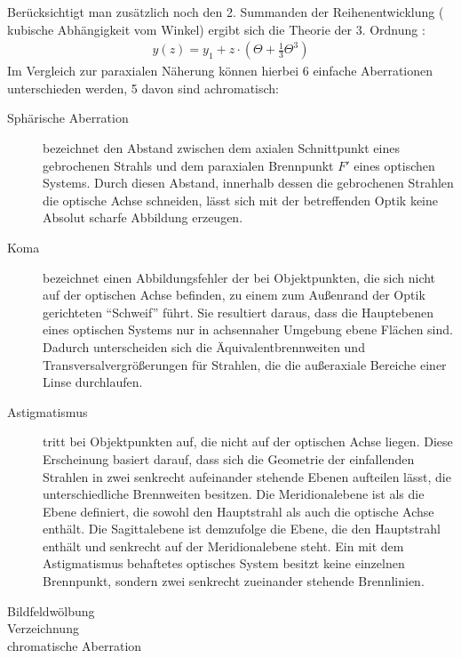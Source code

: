 Berücksichtigt man zusätzlich noch den 2. Summanden der Reihenentwicklung ( kubische Abhängigkeit vom Winkel) ergibt sich die Theorie der 3. Ordnung :
\begin{align*}
y(z)=y_1 + z \cdot (\Theta + \frac{1}{3}\Theta^3)
\end{align*}
Im Vergleich zur paraxialen Näherung können hierbei 6 einfache Aberrationen unterschieden werden, 5 davon sind achromatisch:
\begin{description}
	\item[Sphärische Aberration] bezeichnet den Abstand zwischen dem axialen Schnittpunkt eines gebrochenen Strahls und dem paraxialen Brennpunkt $F'$ eines optischen Systems. Durch diesen Abstand, innerhalb dessen die gebrochenen Strahlen die optische Achse schneiden, lässt sich mit der betreffenden Optik keine Absolut scharfe Abbildung erzeugen. \cite[416ff.]{hecht2014optik}
	\item[Koma] bezeichnet einen Abbildungsfehler der bei Objektpunkten, die sich nicht auf der optischen Achse befinden, zu einem zum Außenrand der Optik gerichteten "`Schweif"' führt. Sie resultiert daraus, dass die Hauptebenen eines optischen Systems nur in achsennaher Umgebung ebene Flächen sind. Dadurch unterscheiden sich die Äquivalentbrennweiten und Transversalvergrößerungen für Strahlen, die die außeraxiale Bereiche einer Linse durchlaufen. \cite[423ff.]{hecht2014optik}
	\item[Astigmatismus] tritt bei Objektpunkten auf, die nicht auf der optischen Achse liegen. Diese Erscheinung basiert darauf, dass sich die Geometrie der einfallenden Strahlen in zwei senkrecht aufeinander stehende Ebenen aufteilen lässt, die unterschiedliche Brennweiten besitzen. Die Meridionalebene ist als die Ebene definiert, die sowohl den Hauptstrahl als auch die optische Achse enthält. Die Sagittalebene ist demzufolge die Ebene, die den Hauptstrahl enthält und senkrecht auf der Meridionalebene steht. Ein mit dem Astigmatismus behaftetes optisches System besitzt keine einzelnen Brennpunkt, sondern zwei senkrecht zueinander stehende Brennlinien. \cite[428ff.]{hecht2014optik}
	\item[Bildfeldwölbung]
	\item[Verzeichnung]
	\item[chromatische Aberration]
\end{description}